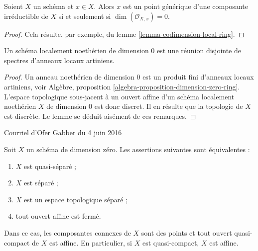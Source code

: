 \begin{lemma}
\label{lemma-generic-point}
Soient $X$ un schéma et $x \in X$. Alors $x$ est un point générique
d'une composante irréductible de $X$ si et seulement si $\dim(\mathcal{O}_{X, x}) = 0$.
\end{lemma}

\begin{proof}
Cela résulte, par exemple, du lemme \ref{lemma-codimension-local-ring}.
\end{proof}

\begin{lemma}
\label{lemma-locally-Noetherian-dimension-0}
Un schéma localement noethérien de dimension $0$ est une réunion
disjointe de spectres d'anneaux locaux artiniens.
\end{lemma}

\begin{proof}
Un anneau noethérien de dimension $0$ est un produit fini d'anneaux locaux
artiniens, voir
Algèbre, proposition \ref{algebra-proposition-dimension-zero-ring}.
L'espace topologique sous-jacent à un ouvert affine d'un schéma localement noethérien $X$ de dimension
$0$ est donc discret. Il en résulte que
la topologie de $X$ est discrète. Le lemme se déduit aisément de ces
remarques.
\end{proof}

\begin{lemma}
\label{lemma-dimension-zero}
\begin{reference}
Courriel d'Ofer Gabber du 4 juin 2016
\end{reference}
Soit $X$ un schéma de dimension zéro. Les assertions suivantes sont équivalentes :
\begin{enumerate}
\item $X$ est quasi-séparé ;
\item $X$ est séparé ;
\item $X$ est un espace topologique séparé ;
\item tout ouvert affine est fermé.
\end{enumerate}
Dans ce cas, les composantes connexes de $X$ sont des points et tout
ouvert quasi-compact de $X$ est affine. En particulier, si $X$
est quasi-compact, $X$ est affine.
\end{lemma}

